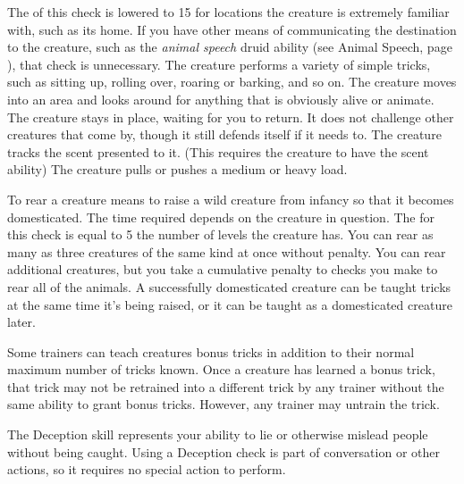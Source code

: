         The  of this check is lowered to 15 for locations the creature is extremely familiar with, such as its home.
        If you have other means of communicating the destination to the creature, such as the \textit{animal speech} druid ability (see Animal Speech, page ), that check is unnecessary.
         The creature performs a variety of simple tricks, such as sitting up, rolling over, roaring or barking, and so on.
         The creature moves into an area and looks around for anything that is obviously alive or animate.
         The creature stays in place, waiting for you to return. It does not challenge other creatures that come by, though it still defends itself if it needs to.
         The creature tracks the scent presented to it. (This requires the creature to have the scent ability)
         The creature pulls or pushes a medium or heavy load.

         To rear a creature means to raise a wild creature from infancy so that it becomes domesticated. The time required depends on the creature in question. The  for this check is equal to 5 \add the number of levels the creature has. You can rear as many as three creatures of the same kind at once without penalty. You can rear additional creatures, but you take a cumulative  penalty to checks you make to rear all of the animals. A successfully domesticated creature can be taught tricks at the same time it's being raised, or it can be taught as a domesticated creature later.

        \label{Bonus Tricks} Some trainers can teach creatures bonus tricks in addition to their normal maximum number of tricks known.
        Once a creature has learned a bonus trick, that trick may not be retrained into a different trick by any trainer without the same ability to grant bonus tricks.
        However, any trainer may untrain the trick.

\newpage
{}
        The Deception skill represents your ability to lie or otherwise mislead people without being caught.
        Using a Deception check is part of conversation or other actions, so it requires no special action to perform.


